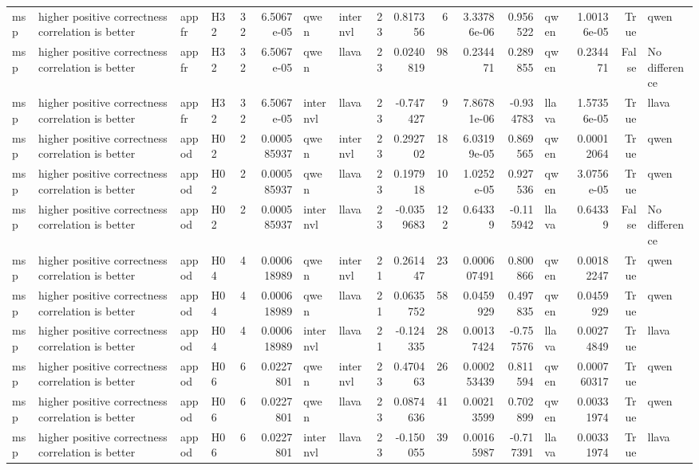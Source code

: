\begin{longtable}{llllrrllrrrrrlrrl}
msp & higher positive correctness correlation is better & appfr & H32 & 32 & 6.5067e-05 & qwen & internvl & 23 & 0.817356 & 6 & 3.33786e-06 & 0.956522 & qwen & 1.00136e-05 & True & qwen \\
msp & higher positive correctness correlation is better & appfr & H32 & 32 & 6.5067e-05 & qwen & llava & 23 & 0.0240819 & 98 & 0.234471 & 0.289855 & qwen & 0.234471 & False & No difference \\
msp & higher positive correctness correlation is better & appfr & H32 & 32 & 6.5067e-05 & internvl & llava & 23 & -0.747427 & 9 & 7.86781e-06 & -0.934783 & llava & 1.57356e-05 & True & llava \\
msp & higher positive correctness correlation is better & appod & H02 & 2 & 0.000585937 & qwen & internvl & 23 & 0.292702 & 18 & 6.03199e-05 & 0.869565 & qwen & 0.00012064 & True & qwen \\
msp & higher positive correctness correlation is better & appod & H02 & 2 & 0.000585937 & qwen & llava & 23 & 0.197918 & 10 & 1.0252e-05 & 0.927536 & qwen & 3.0756e-05 & True & qwen \\
msp & higher positive correctness correlation is better & appod & H02 & 2 & 0.000585937 & internvl & llava & 23 & -0.0359683 & 122 & 0.64339 & -0.115942 & llava & 0.64339 & False & No difference \\
msp & higher positive correctness correlation is better & appod & H04 & 4 & 0.000618989 & qwen & internvl & 21 & 0.261447 & 23 & 0.000607491 & 0.800866 & qwen & 0.00182247 & True & qwen \\
msp & higher positive correctness correlation is better & appod & H04 & 4 & 0.000618989 & qwen & llava & 21 & 0.0635752 & 58 & 0.0459929 & 0.497835 & qwen & 0.0459929 & True & qwen \\
msp & higher positive correctness correlation is better & appod & H04 & 4 & 0.000618989 & internvl & llava & 21 & -0.124335 & 28 & 0.00137424 & -0.757576 & llava & 0.00274849 & True & llava \\
msp & higher positive correctness correlation is better & appod & H06 & 6 & 0.0227801 & qwen & internvl & 23 & 0.470463 & 26 & 0.000253439 & 0.811594 & qwen & 0.000760317 & True & qwen \\
msp & higher positive correctness correlation is better & appod & H06 & 6 & 0.0227801 & qwen & llava & 23 & 0.0874636 & 41 & 0.00213599 & 0.702899 & qwen & 0.00331974 & True & qwen \\
msp & higher positive correctness correlation is better & appod & H06 & 6 & 0.0227801 & internvl & llava & 23 & -0.150055 & 39 & 0.00165987 & -0.717391 & llava & 0.00331974 & True & llava \\

\end{longtable}

